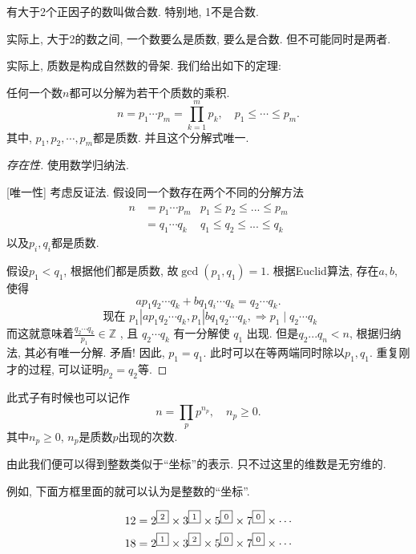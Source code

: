 \documentclass{ctexart}
\begin{document}
\begin{definition}[合数] 有大于2个正因子的数叫做合数. 特别地, 1不是合数. 
\end{definition}

实际上, 大于2的数之间, 一个数要么是质数, 要么是合数. 但不可能同时是两者. 

实际上, 质数是构成自然数的骨架. 我们给出如下的定理: 

\begin{theorem}[唯一分解定理] 任何一个数$n$都可以分解为若干个质数的乘积. 
    $$
n=p_1 \cdots p_m=\prod_{k=1}^m p_k, \quad p_1 \leqslant \cdots \leqslant p_m .
$$
其中, $p_1, p_2, \cdots, p_m$都是质数. 并且这个分解式唯一. 
    
\end{theorem}

\begin{proof}
    [存在性] 使用数学归纳法. 

    [唯一性] 考虑反证法. 假设同一个数存在两个不同的分解方法
    $$
\begin{aligned}
    n & =p_1 \cdots p_m & p_1\leq p_2\leq ...\leq p_m\\
      & =q_1 \cdots q_{k} & q_1 \leq q_2 \leq  ... \leq  q_k
\end{aligned}
$$
以及$p_i, q_i$都是质数. 


 假设$p_1<q_1$, 根据他们都是质数, 故$\gcd(p_1, q_1)=1.$ 根据Euclid算法, 存在$a, b$, 使得
$$
a p_1 q_2 \cdots q_k+b q_1 q_i \cdots q_k=q_2 \cdots q_k .
$$
$$
\text { 现在 } p_1\left|a p_1 q_2 \cdots q_k, p_1\right| b q_1 q_2 \cdots q_k, \Rightarrow p_1 \mid q_2 \cdots q_k
$$
而这就意味着$\frac{q_2 \cdots q_k}{p_1} \in \mathbb{Z}$ ,  且 $q_2 \cdots q_k$ 有一分解使 $q_1$ 出现.
但是$q_2 ... q_n < n$, 根据归纳法, 其必有唯一分解. 矛盾! 
因此, $p_1=q_1$. 此时可以在等两端同时除以$p_1, q_1$. 重复刚才的过程, 可以证明$p_2=q_2$等. 

\end{proof}

\begin{remark}
    此式子有时候也可以记作
    $$
n=\prod_p p^{n_p}, \quad n_p \geqslant 0 .
$$
其中$n_p \geq 0$, $n_p$是质数$p$出现的次数. 
\end{remark}

由此我们便可以得到整数类似于``坐标''的表示. 只不过这里的维数是无穷维的. 

例如, 下面方框里面的就可以认为是整数的``坐标''. 

\begin{align*}
12 & =2^{\text{\fbox{2}}}\times3^{\text{\fbox{1}}}\times5^{\text{\fbox{0}}}\times7^{\text{\fbox{0}}}\times\cdots\\
18 & =2^{\text{\fbox{1}}}\times3^{\text{\fbox{2}}}\times5^{\text{\fbox{0}}}\times7^{\text{\fbox{0}}}\times\cdots
\end{align*}
\end{document}
